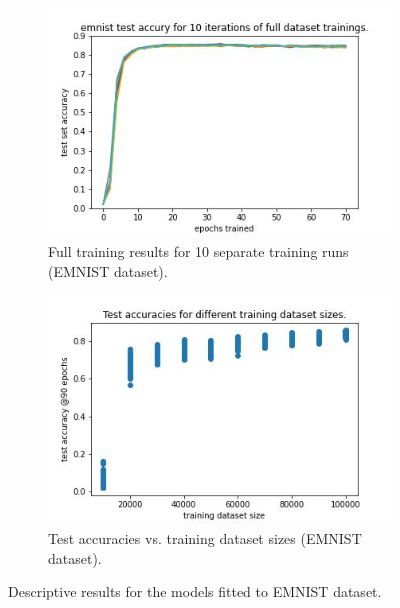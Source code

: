 \documentclass{article} %
\begin{document}
\begin{figure}
    \begin{subfigure}{.5\textwidth}
        \centering
        \includegraphics[width=.8\linewidth]{emnist/full_dataset_acc_vs_epoch.jpg}
        \caption{Full training results for 10 separate training runs (EMNIST dataset).}
        \label{fig_full_dataset_epoch_vs_acc}
    \end{subfigure}%
    \begin{subfigure}{.5\textwidth}
        \centering
        \includegraphics[width=.8\linewidth]{emnist/training_datasetsize_vs_test_acc.jpg}
        \caption{Test accuracies vs. training dataset sizes (EMNIST dataset).}
        \label{fig_traing_subset_size_vs_test_acc}
    \end{subfigure}

    \caption{Descriptive results for the models fitted to EMNIST dataset.}
    \label{fig:desc_plots_emnist}
\end{figure}
\end{document}
